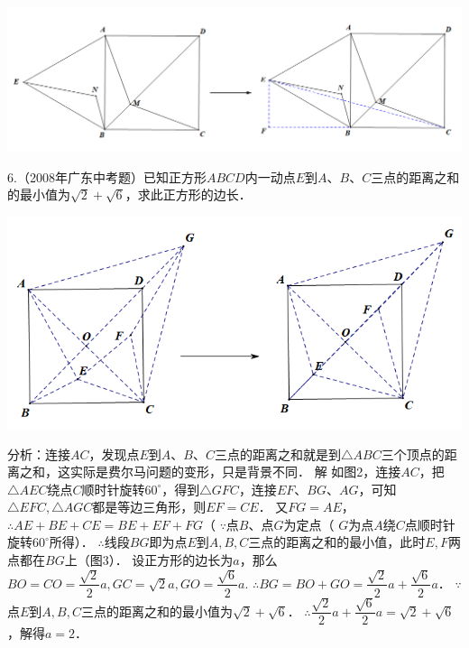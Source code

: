 \documentclass[10pt]{ctexart}
\begin{document}
\begin{center}
	\includegraphics[scale=0.5]{figure/feimadian09}
\end{center}

\begin{shaded}
6.（2008年广东中考题）已知正方形$ABCD$内一动点$E$到$A$、$B$、$C$三点的距离之和的最小值为$\sqrt{2}+\sqrt{6}$，求此正方形的边长．
\end{shaded}

\begin{center}
	\includegraphics[scale=0.6]{figure/feimadian11}
\end{center}

分析：连接$AC$，发现点$E$到$A$、$B$、$C$三点的距离之和就是到$\triangle ABC$三个顶点的距离之和，这实际是费尔马问题的变形，只是背景不同．
解   如图2，连接$AC$，把$\triangle AEC$绕点$C$顺时针旋转$60^\circ$，得到$\triangle GFC$，连接$EF$、$BG$、$AG$，可知$\triangle EFC,\triangle AGC$都是等边三角形，则$EF=CE$．
又$FG=AE$，
$\therefore AE+BE+CE = BE+EF+FG（$
$\because$点$B$、点$G$为定点（ $G$为点$A$绕$C$点顺时针旋转$60^\circ$所得）． 
$\therefore$线段$BG$即为点$E$到$A,B,C$三点的距离之和的最小值，此时$E,F$两点都在$BG$上（图3）．
设正方形的边长为$a$，那么
$BO=CO=\dfrac{\sqrt{2}}{2}a,GC=\sqrt{2}a, GO=\dfrac{\sqrt{6}}{2}a$.
$\therefore BG=BO+GO =\dfrac{\sqrt{2}}{2}a+\dfrac{\sqrt{6}}{2}a$．
$\because$点$E$到$A,B,C$三点的距离之和的最小值为$\sqrt{2}+\sqrt{6}$．
$\therefore \dfrac{\sqrt{2}}{2}a+\dfrac{\sqrt{6}}{2}a=\sqrt{2}+\sqrt{6}$，解得$a=2$．
\end{document}
